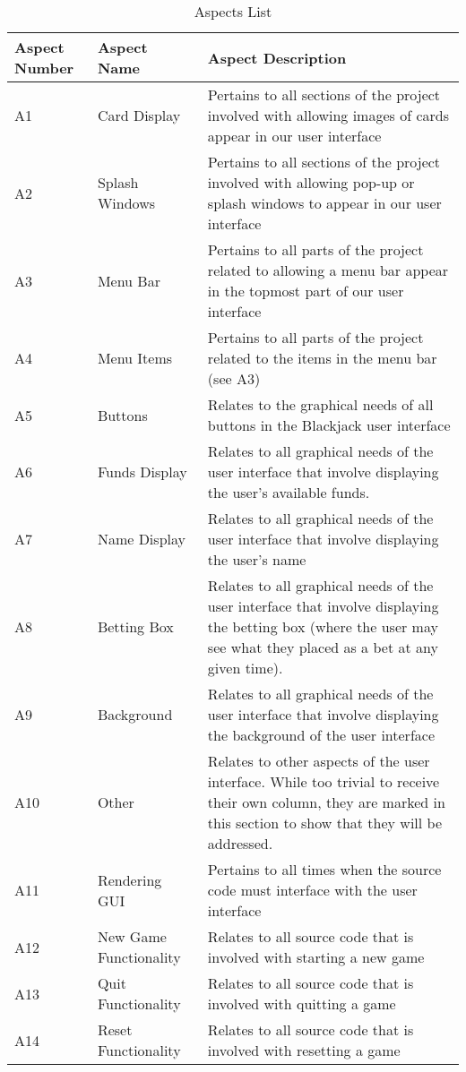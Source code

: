 \documentclass [landscape, 8pt] {article}
\begin{document}
	\begin {table}
	\caption {Aspects List}
		\centering
		\begin {tabular}{p{4cm} p{4cm} p{15cm}}
			\hline\hline
			Aspect Number & Aspect Name& Aspect Description \\[0.5ex]
			\hline
			A1 & Card Display & Pertains to all sections of the project involved with allowing images of cards appear in our user interface\\
			A2 & Splash Windows & Pertains to all sections of the project involved with allowing pop-up or splash windows to appear in our user interface\\
			A3 & Menu Bar & Pertains to all parts of the project related to allowing a menu bar appear in the topmost part of our user interface\\
			A4 & Menu Items & Pertains to all parts of the project related to the items in the menu bar (see A3)\\
			A5 & Buttons & Relates to the graphical needs of all buttons in the Blackjack user interface \\
			A6 & Funds Display & Relates to all graphical needs of the user interface that involve displaying the user's available funds. \\
			A7 & Name Display & Relates to all graphical needs of the user interface that involve displaying the user's name\\
			A8 & Betting Box & Relates to all graphical needs of the user interface that involve displaying the betting box (where the user may see what they placed as a bet at any given time).\\
			A9 & Background & Relates to all graphical needs of the user interface that involve displaying the background of the user interface\\
			A10 & Other & Relates to other aspects of the user interface. While too trivial to receive their own column, they are marked in this section to show that they will be addressed. \\
			A11 & Rendering GUI & Pertains to all times when the source code must interface with the user interface\\
			A12 & New Game Functionality & Relates to all source code that is involved with starting a new game \\
			A13 & Quit Functionality & Relates to all source code that is involved with quitting a game\\
			A14 & Reset Functionality & Relates to all source code that is involved with resetting a game\\

\end{tabular}
\end{table}
\end{document}
